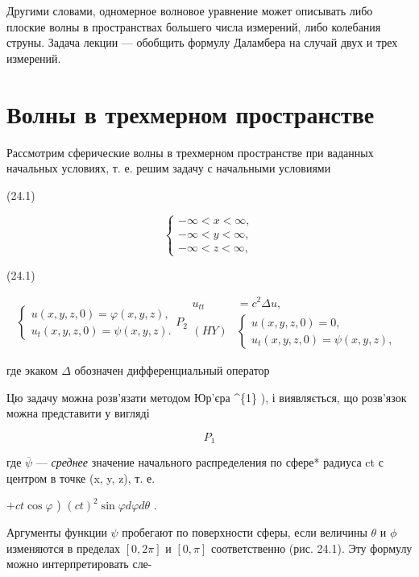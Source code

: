 \documentclass[
  ukrainian,
]{article}
\begin{document}
Другими словами, одномерное волновое уравнение может описывать либо
плоские волны в пространствах большего числа измерений, либо колебания
струны. Задача лекции --- обобщить формулу Даламбера на случай двух и
трех измерений.

\section{Волны в трехмерном
пространстве}\label{ux432ux43eux43bux43dux44b-ux432-ux442ux440ux435ux445ux43cux435ux440ux43dux43eux43c-ux43fux440ux43eux441ux442ux440ux430ux43dux441ux442ux432ux435}

Рассмотрим сферические волны в трехмерном пространстве при ваданных
начальных условиях, т. е. решим задачу с начальными условиями

(24.1)

\[
\begin{cases} -\infty < x < \infty, \\ -\infty < y < \infty, \\ -\infty < z < \infty, \end{cases}
\]

(24.1)

\[
\begin{cases} u(x, y, z, 0) = \varphi(x, y, z), \\ u_{t}(x, y, z, 0) = \psi(x, y, z). \end{cases}
P_{2}
\begin{aligned} u_{tt} &= c^2 \Delta u, \\ (HY) & \begin{cases} u(x, y, z, 0) = 0, \\ u_t(x, y, z, 0) = \psi(x, y, z), \end{cases} \end{aligned}
\]

где экаком \(\Delta\) обозначен дифференциальный оператор

Цю задачу можна розв'язати методом \Phi  Юр'єра \^{}\{1\} ), і
виявляється, що розв'язок можна представити у вигляді

\[
P_{1}
\]

где \(\overline{\psi}\) --- \emph{среднее} значение начального
распределения \psi  *по сфере* радиуса ct с центром в точке (x, y, z),
т. е.

\(+ ct \cos \varphi\) ) \((ct)^2 \sin \varphi d\varphi d\theta\) .

Аргументы функции \(\psi\) пробегают по поверхности сферы, если величины
\(\theta\) и \(\phi\) изменяются в пределах \([0, 2\pi]\) и \([0, \pi]\)
соответственно (рис. 24.1). Эту формулу можно интерпретировать сле-
\end{document}
